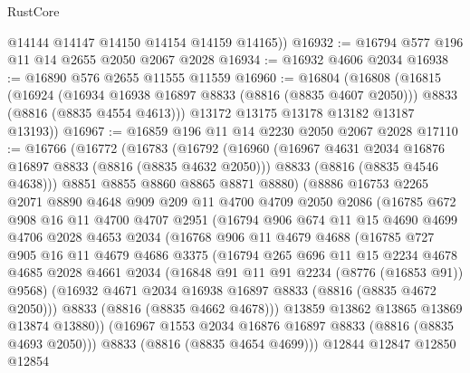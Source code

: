 \begin{lexlean}{RustCore}
\begin{coremodule}
        @14144
        @14147
        @14150
        @14154
        @14159
        @14165))
@16932 := @16794 @577 @196 @11 @14 @2655 @2050 @2067 @2028
@16934 := @16932 @4606 @2034
@16938 := @16890 @576 @2655 @11555 @11559
@16960 := @16804
    (@16808
      (@16815
        (@16924
          (@16934 @16938 @16897 @8833 (@8816 (@8835 @4607 @2050)))
          @8833
          (@8816 (@8835 @4554 @4613)))
        @13172
        @13175
        @13178
        @13182
        @13187
        @13193))
@16967 := @16859 @196 @11 @14 @2230 @2050 @2067 @2028
@17110 := @16766
    (@16772
      (@16783
        (@16792
          (@16960
            (@16967 @4631 @2034 @16876 @16897 @8833 (@8816 (@8835 @4632 @2050)))
            @8833
            (@8816 (@8835 @4546 @4638)))
          @8851
          @8855
          @8860
          @8865
          @8871
          @8880)
        (@8886
          @16753
          @2265
          @2071
          @8890
          @4648
          @909
          @209
          @11
          @4700
          @4709
          @2050
          @2086
          (@16785
            @672
            @908
            @16
            @11
            @4700
            @4707
            @2951
            (@16794
              @906
              @674
              @11
              @15
              @4690
              @4699
              @4706
              @2028
              @4653
              @2034
              (@16768
                @906
                @11
                @4679
                @4688
                (@16785
                  @727
                  @905
                  @16
                  @11
                  @4679
                  @4686
                  @3375
                  (@16794
                    @265
                    @696
                    @11
                    @15
                    @2234
                    @4678
                    @4685
                    @2028
                    @4661
                    @2034
                    (@16848 @91 @11 @91 @2234 (@8776 (@16853 @91)) @9568)
                    (@16932 @4671 @2034 @16938 @16897 @8833 (@8816 (@8835 @4672 @2050)))
                    @8833
                    (@8816 (@8835 @4662 @4678)))
                  @13859
                  @13862
                  @13865
                  @13869
                  @13874
                  @13880))
              (@16967 @1553 @2034 @16876 @16897 @8833 (@8816 (@8835 @4693 @2050)))
              @8833
              (@8816 (@8835 @4654 @4699)))
            @12844
            @12847
            @12850
            @12854

\end{coremodule}
\end{lexlean}
